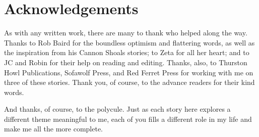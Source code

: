 \chapter*{Acknowledgements}

As with any written work, there are many to thank who helped along the way. Thanks to Rob Baird for the boundless optimism and flattering words, as well as the inspiration from his Cannon Shoals stories; to Zeta for all her heart; and to JC and Robin for their help on reading and editing. Thanks, also, to Thurston Howl Publications, Sofawolf Press, and Red Ferret Press for working with me on three of these stories. Thank you, of course, to the advance readers for their kind words.

And thanks, of course, to the polycule. Just as each story here explores a different theme meaningful to me, each of you fills a different role in my life and make me all the more complete.

\chapter*{}

